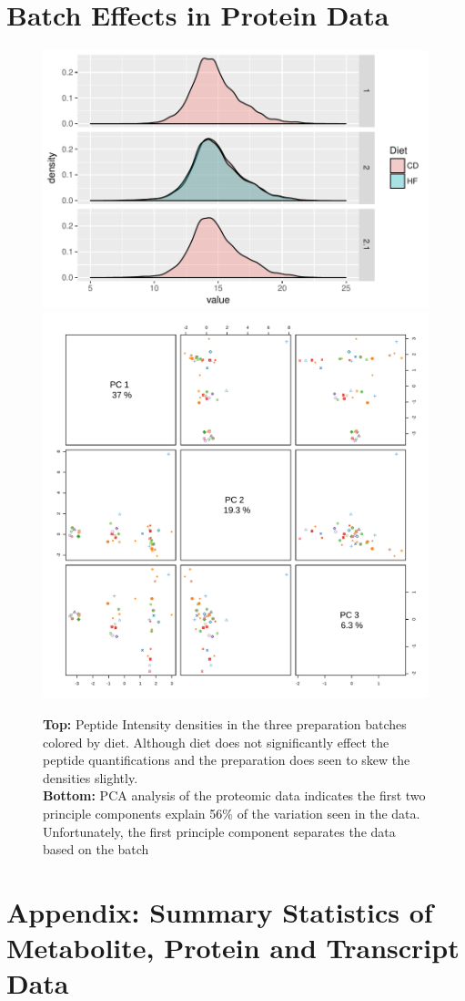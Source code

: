 \documentclass[a4paper,11pt,twoside]{book}
\begin{document}
\begin{subappendices}
\section{Batch Effects in Protein Data}
\begin{figure}[ht!b]
	\centering
	\includegraphics[width=0.7\linewidth]{3.Proteomics/protein_batch_effect_figure.pdf}
	\includegraphics[width=0.7\linewidth]{"3.Proteomics/Proteomics PCA"}
	\caption{ \textbf{Top:} Peptide Intensity densities in the three preparation batches colored by diet. Although diet does not significantly effect the peptide quantifications and the preparation does seen to skew the densities slightly. \\ \textbf{Bottom: } PCA analysis of the proteomic data indicates the first two principle components explain 56\% of the variation seen in the data. Unfortunately, the first principle component separates the data based on the batch}
	\label{fig:Proteomics Batch Effects PCA}
\end{figure}

\section{Appendix: Summary Statistics of Metabolite, Protein and Transcript Data}


\end{subappendices}
\end{document}
